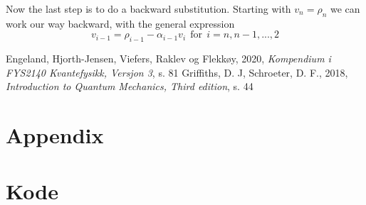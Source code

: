 \documentclass[reprint, english,notitlepage]{revtex4-1}  %
\begin{document}
Now the last step is to do a backward substitution. Starting with $v_n = \rho_n$ we can work our way backward, with the general expression
\begin{equation}
	v_{i-1} = \rho_{i-1} - \alpha_{i-1}v_i \ \ \text{for} \ \ i = n, n-1, ..., 2
\end{equation}
\onecolumngrid
\vspace{1cm} %
\newpage

\begin{thebibliography}{}
 Engeland, Hjorth-Jensen, Viefers, Raklev og Flekkøy,  2020, \textit{Kompendium i FYS2140 Kvantefysikk, Versjon 3}, s. 81
 Griffiths, D. J, Schroeter, D. F.,  2018, \textit{Introduction to Quantum Mechanics, Third edition}, s. 44

\end{thebibliography}

\section{Appendix}


\section{Kode}

% 
%
% 
%
% 
%
% 
%
% 
%
% 
%
% 
\end{document}
